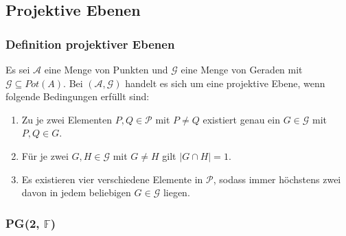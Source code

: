 \documentclass{beamer}
\theoremstyle{plain}
\theoremstyle{definition}
\theoremstyle{rem}
\newcommand{\pgtwo}{PG(2, $\mathbb{F}$)\ }
\begin{document}
\subsection{Projektive Ebenen}
\begin{frame}
    \frametitle{Definition projektiver Ebenen}
    \begin{definition}
        Es sei $\mathcal{A}$ eine Menge von Punkten und $\mathcal{G}$ eine Menge von Geraden mit $\mathcal{G} \subseteq Pot(A)$.
        Bei $(\mathcal{A},\mathcal{G})$ handelt es sich um eine projektive Ebene, wenn folgende Bedingungen erfüllt sind:
	\begin{enumerate}[<+->]
		\item Zu je zwei Elementen $P, Q\in \mathcal{P}$ mit $P\ne Q$ existiert genau ein $G\in\mathcal{G}$ mit $P, Q \in G$. \\
		\item Für je zwei $G,H\in\mathcal{G}$ mit $G\ne H$ gilt $|G\cap H|=1$.
		\item Es existieren vier verschiedene Elemente in $\mathcal{P}$, sodass immer höchstens zwei davon in jedem beliebigen $G\in\mathcal{G}$ liegen.
	\end{enumerate}
    \end{definition}
\end{frame}
\begin{frame}
    \frametitle{\pgtwo}
\end{frame}
\end{document}
